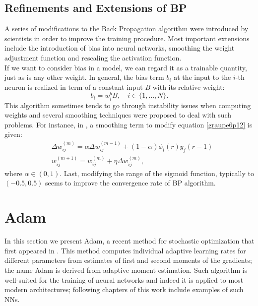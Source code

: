 \documentclass[%
    corpo=11pt,
    twoside,
    stile=classica,
    oldstyle,
    autoretitolo,
    tipotesi=magistrale,
    greek,
    evenboxes,
    english
]{toptesi}
\begin{document}
\subsection{Refinements and Extensions of BP}
A series of modifications to the Back Propagation algorithm were introduced by scientists in order to improve the training procedure. Most important extensions include the introduction of bias into neural networks, smoothing the weight adjustment function and rescaling the activation function. \\
If we want to consider bias in a model, we can regard it as a trainable quantity, just as is any other weight. In general, the bias term $b_i$ at the input to the $i$-th neuron is realized in term of a constant input $B$ with its relative weight:
\begin{equation}
b_i = w^b_i B, \quad i \in \{1,\dots,N\}.
\end{equation}
This algorithm sometimes tends to go through instability issues when computing weights and several smoothing techniques were proposed to deal with such problems. For instance, in \cite{sejnowski}, a smoothing term to modify equation \eqref{graupe6p12} is given:
\begin{align}
&\Delta w_{ij}^{(m)} = \alpha \Delta w_{ij}^{(m-1)} + (1-\alpha)\phi_i(r)y_j(r-1)  \nonumber \\
& w_{ij}^{(m+1)} = w_{ij}^{(m)} + \eta \Delta w_{ij}^{(m)},
\end{align}
where $\alpha \in \left(0,1 \right)$.
Last, modifying the range of the sigmoid function, typically to $\left(-0.5,0.5\right)$ seems to improve the convergence rate of BP algorithm. 
\newpage 

\section{Adam}
In this section we present Adam, a recent method for stochastic optimization that first appeared in \cite{adam}. This method computes individual adaptive learning rates for different parameters from estimates of first and second moments of the gradients; the name Adam is derived from adaptive moment estimation. 
Such algorithm is well-suited for the training of neural networks and indeed it is applied to most modern architectures; following chapters of this work include examples of such NNs.
\end{document}
